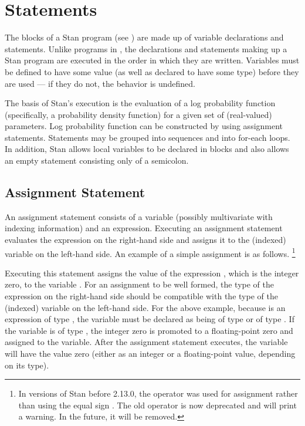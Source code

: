 \chapter{Statements}

\noindent
The blocks of a Stan program (see ) are made up of
variable declarations and statements.  Unlike programs in \BUGS, the
declarations and statements making up a Stan program are executed in
the order in which they are written.  Variables must be defined to
have some value (as well as declared to have some type) before they
are used --- if they do not, the behavior is undefined.

The basis of Stan's execution is the evaluation of a log probability
function (specifically, a probability density function) for a given
set of (real-valued) parameters. Log probability function can be
constructed by using assignment statements.  Statements may be grouped
into sequences and into for-each loops.  In addition, Stan allows
local variables to be declared in blocks and also allows an empty
statement consisting only of a semicolon.


\section{Assignment Statement}\label{assignment-statement.section}

An assignment statement consists of a variable (possibly multivariate
with indexing information) and an expression.  Executing an
assignment statement evaluates the expression on the right-hand side
and assigns it to the (indexed) variable on the left-hand side.  An
example of a simple assignment is as follows.%
%
\footnote{In versions of Stan before 2.13.0, the operator \code{<-} was
  used for assignment rather than using the equal sign \code{=}.  The
  old operator \code{<-} is now deprecated and will print a warning.
  In the future, it will be removed.}
%
\begin{quote}
\end{quote}
%
Executing this statement assigns the value of the expression ,
which is the integer zero, to the variable .  For an assignment
to be well formed, the type of the expression on the right-hand side
should be compatible with the type of the (indexed) variable on the
left-hand side.  For the above example, because  is an
expression of type , the variable  must be declared
as being of type  or of type .  If the variable
is of type , the integer zero is promoted to a
floating-point zero and assigned to the variable.  After the
assignment statement executes, the variable  will have the
value zero (either as an integer or a floating-point value, depending on
its type).

